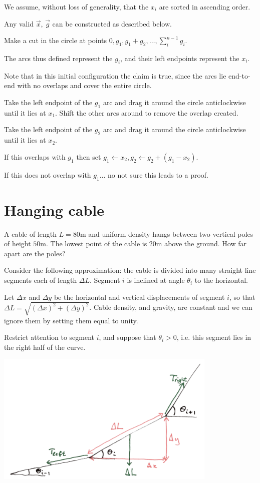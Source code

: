 \documentclass[12pt]{article}
\begin{document}
We assume, without loss of generality, that the $x_i$ are sorted in ascending order.

Any valid $\vec x$, $\vec g$ can be constructed as described below.

Make a cut in the circle at points $0, g_1, g_1 + g_2, \ldots, \sum_i^{n-1}g_i$.

The arcs thus defined represent the $g_i$, and their left endpoints represent the $x_i$.

Note that in this initial configuration the claim is true, since the arcs lie end-to-end with no
overlaps and cover the entire circle.

Take the left endpoint of the $g_1$ arc and drag it around the circle anticlockwise until it lies
at $x_1$. Shift the other arcs around to remove the overlap created.

Take the left endpoint of the $g_2$ arc and drag it around the circle anticlockwise until it lies
at $x_2$.

If this overlaps with $g_1$ then set $g_1 \leftarrow x_2, g_2 \leftarrow g_2 + (g_1 - x_2)$.

If this does not overlap with $g_1$... no not sure this leads to a proof.

\section{Hanging cable}

\begin{mdframed}
  A cable of length $L=80$m and uniform density hangs between two vertical poles of height
  $50$m. The lowest point of the cable is $20$m above the ground. How far apart are the poles?
\end{mdframed}

Consider the following approximation: the cable is divided into many straight line segments each of
length $\Delta L$. Segment $i$ is inclined at angle $\theta_i$ to the horizontal.

Let $\Delta x$ and $\Delta y$ be the horizontal and vertical displacements of segment $i$, so that
$\Delta L = \sqrt{(\Delta x)^2 + (\Delta y)^2}$. Cable density, and gravity, are constant and we
can ignore them by setting them equal to unity.

Restrict attention to segment $i$, and suppose that $\theta_i > 0$, i.e. this segment lies in the
right half of the curve.

\begin{mdframed}
\includegraphics[width=300pt]{img/misc--puzzles--hanging-cable.png}
\end{mdframed}
\end{document}
